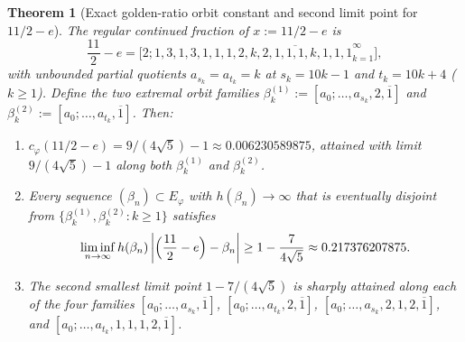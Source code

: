 \documentclass[11pt]{amsart}
\newtheorem{theorem}{Theorem}[section]
\theoremstyle{definition}
\theoremstyle{remark}
\numberwithin{equation}{section}
\begin{document}
\begin{theorem}[Exact golden-ratio orbit constant and second limit point for $11/2-e$]\label{thm:golden-b2-exact}
The regular continued fraction of $x:=11/2-e$ is
\[
 \frac{11}{2}-e
 =\bigl[2;1,3,1,3,1,1,1,\overline{2,k,2,1,1,1,k,1,1,1}_{k=1}^\infty\bigr],
\]
with unbounded partial quotients $a_{s_k}=a_{t_k}=k$ at
$s_k=10k-1$ and $t_k=10k+4$ ($k\ge1$). Define the two extremal orbit
families $\beta_k^{(1)}:=[a_0;\ldots,a_{s_k},2,\overline1]$ and
$\beta_k^{(2)}:=[a_0;\ldots,a_{t_k},\overline1]$. Then:
\begin{enumerate}
\item $c_\varphi(11/2-e)=9/(4\sqrt5)-1\approx 0.006230589875$, attained
      with limit $9/(4\sqrt5)-1$ along both $\beta_k^{(1)}$ and
      $\beta_k^{(2)}$.
\item Every sequence $(\beta_n)\subset E_\varphi$ with
      $h(\beta_n)\to\infty$ that is eventually disjoint from
      $\{\beta_k^{(1)},\beta_k^{(2)}:k\ge1\}$ satisfies
      \[
       \liminf_{n\to\infty} h(\beta_n)\left|\Bigl(\frac{11}{2}-e\Bigr)-\beta_n\right|
       \ge 1-\frac{7}{4\sqrt5}\approx 0.217376207875.
      \]
\item The second smallest limit point $1-7/(4\sqrt5)$ is sharply
      attained along each of the four families
      $[a_0;\ldots,a_{s_k},\overline1]$,
      $[a_0;\ldots,a_{t_k},2,\overline1]$,
      $[a_0;\ldots,a_{s_k},2,1,2,\overline1]$, and
      $[a_0;\ldots,a_{t_k},1,1,1,2,\overline1]$.
\end{enumerate}
\end{theorem}
\end{document}
